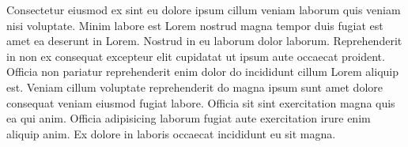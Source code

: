 
Consectetur eiusmod ex sint eu dolore ipsum cillum veniam laborum quis veniam nisi voluptate. Minim labore est Lorem nostrud magna tempor duis fugiat est amet ea deserunt in Lorem. Nostrud in eu laborum dolor laborum. Reprehenderit in non ex consequat excepteur elit cupidatat ut ipsum aute occaecat proident. Officia non pariatur reprehenderit enim dolor do incididunt cillum Lorem aliquip est. Veniam cillum voluptate reprehenderit do magna ipsum sunt amet dolore consequat veniam eiusmod fugiat labore. Officia sit sint exercitation magna quis ea qui anim. Officia adipisicing laborum fugiat aute exercitation irure enim aliquip anim. Ex dolore in laboris occaecat incididunt eu sit magna.

